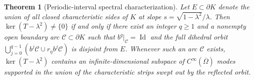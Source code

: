 \documentclass[11pt,reqno]{amsart}
\newtheorem{theorem}{Theorem}[section]
\theoremstyle{definition}
\theoremstyle{remark}
\DeclareMathOperator{\Id}{Id}
\begin{document}
\begin{theorem}[Periodic-interval spectral characterization]\label{thm:periodic-interval}
Let $E \subset \partial K$ denote the union of all closed characteristic sides of $K$ at slope $s = \sqrt{1-\lambda^2}/\lambda$. Then $\ker(T - \lambda^2) \ne \{0\}$ if and only if there exist an integer $q \ge 1$ and a nonempty open boundary arc $\mathcal{C} \subset \partial K$ such that $b^q|_{\mathcal{C}} = \Id$ and the full dihedral orbit $\bigcup_{j=0}^{q-1} (b^j \mathcal{C} \cup r_\eta b^j \mathcal{C})$ is disjoint from $E$. Whenever such an arc $\mathcal{C}$ exists, $\ker(T - \lambda^2)$ contains an infinite-dimensional subspace of $C^\infty(\overline{\Omega})$ modes supported in the union of the characteristic strips swept out by the reflected orbit.
\end{theorem}
\end{document}
